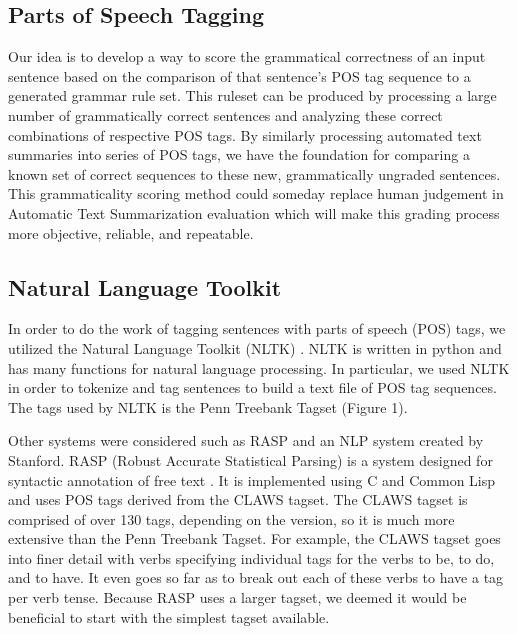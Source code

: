 \documentclass[11pt,a4paper]{article}
\begin{document}
\begin{multicols}{2}
\section{Parts of Speech Tagging}
Our idea is to develop a way to score the grammatical correctness of an input sentence based on the comparison of that sentence's POS tag sequence to a generated grammar rule set. This ruleset can be produced by processing a large number of grammatically correct sentences and analyzing these correct combinations of respective POS tags. By similarly processing automated text summaries into series of POS tags, we have the foundation for comparing a known set of correct sequences to these new, grammatically ungraded sentences. This grammaticality scoring method could someday replace human judgement in Automatic Text Summarization evaluation which will make this grading process more objective, reliable, and repeatable.


\subsection{Natural Language Toolkit}

In order to do the work of tagging sentences with parts of speech (POS) tags, we utilized the Natural Language Toolkit (NLTK) \cite{nltk}. NLTK is written in python and has many functions for natural language processing. In particular, we used NLTK in order to tokenize and tag sentences to build a text file of POS tag sequences. The tags used by NLTK is the Penn Treebank Tagset (Figure 1).

Other systems were considered such as RASP and an NLP system created by Stanford. RASP (Robust Accurate Statistical Parsing) is a system designed for syntactic annotation of free text \cite{briscoe}. It is implemented using C and Common Lisp and uses POS tags derived from the CLAWS tagset. The CLAWS tagset is comprised of over 130 tags, depending on the version, so it is much more extensive than the Penn Treebank Tagset. For example, the CLAWS tagset goes into finer detail with verbs specifying individual tags for the verbs to be, to do, and to have. It even goes so far as to break out each of these verbs to have a tag per verb tense. Because RASP uses a larger tagset, we deemed it would be beneficial to start with the simplest tagset available.


\end{multicols}
\end{document}
